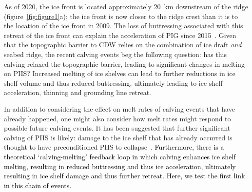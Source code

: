 \documentclass[draft]{agujournal2019}
\newcommand{\blue}[1]{\textcolor{blue}{#1}}
\newcommand{\red}[1]{\textcolor{red}{#1}}
\renewcommand{\blue}[1]{{\textcolor{black}{#1}}} %
\renewcommand{\red}[1]{{}} %
\begin{document}
As of 2020, the ice front is located approximately 20~km downstream of the ridge (figure~\ref{fig:figure1}a); the ice front is now closer to the ridge crest than it is to the location of the ice front in 2009. The loss of buttressing associated with this retreat of the ice front can explain the acceleration of PIG since 2015~\cite{Joughin2021ScienceAdv}. Given that the topographic barrier to CDW relies on the combination of ice draft \textit{and} seabed ridge, the recent calving events beg the following question: has this calving relaxed the topographic barrier, leading to significant changes in melting on PIIS? Increased melting of ice shelves can lead to further reductions in ice shelf volume and thus reduced buttressing, ultimately leading to ice shelf acceleration, thinning and grounding line retreat.

In addition to considering the effect on melt rates of calving events that have already happened, one might also consider how melt rates might respond to possible future calving events. It has been suggested that further significant calving of PIIS is likely: damage to the ice shelf that has already occurred is thought to have preconditioned PIIS to collapse~\cite{Lhermitte2020PNAS}. \blue{Furthermore, there is a theoretical `calving-melting' feedback loop in which calving enhances ice shelf melting, resulting in reduced buttressing and thus ice acceleration, ultimately resulting in ice shelf damage and thus further retreat. Here, we test the first link in this chain of events.} %
 \red{Additionally, there is a theoretical feedback loop in which damage leads to calving, resulting in reduced buttressing and thus ice acceleration, which promotes further damage. We expect further calving as part of this feedback process, which also interacts with unbalanced melting.}
\end{document}
